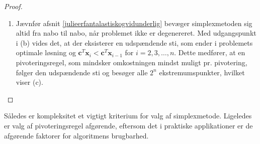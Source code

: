 \begin{proof}
\begin{enumerate}[label = (\alph*)]
%
\item Jævnfør afsnit \ref{julieerfantalastiskogvidunderlig} bevæger simplexmetoden sig altid fra nabo til nabo, når problemet ikke er degenereret.
Med udgangspunkt i (b) vides det, at der eksisterer en udspændende sti, som ender i problemets optimale løsning og $\textbf{c}^T\textbf{x}_i < \textbf{c}^T\textbf{x}_{i-1}$ for $i = 2, 3, \ldots ,n$.
Dette medfører, at en pivoteringsregel, som mindsker omkostningen mindst muligt pr. pivotering, følger den udspændende sti og besøger alle $2^n$ ekstremumspunkter, hvilket viser (c).
\end{enumerate}
\end{proof}
%
Således er kompleksitet et vigtigt kriterium for valg af simplexmetode.
Ligeledes er valg af pivoteringsregel afgørende, eftersom det i praktiske applikationer er de afgørende faktorer for algoritmens brugbarhed.
